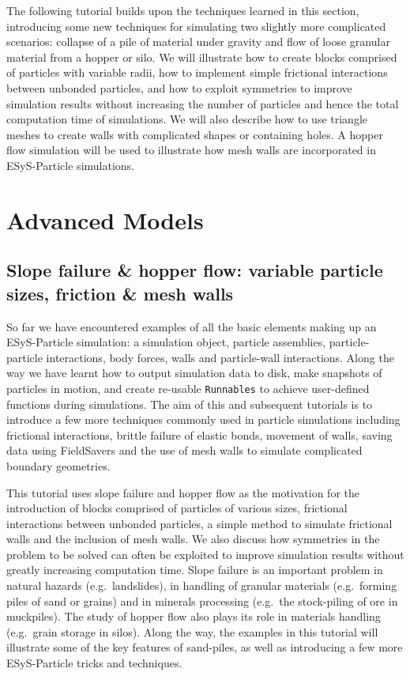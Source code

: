 The following tutorial builds upon the techniques learned in this section, introducing some new techniques for simulating two slightly more complicated scenarios: collapse of a pile of material under gravity and flow of loose granular material from a hopper or silo.  We will illustrate how to create blocks comprised of particles with variable radii, how to implement simple frictional interactions between unbonded particles, and how to exploit symmetries to improve simulation results without increasing the number of particles and hence the total computation time of simulations. We will also describe how to use triangle meshes to create walls with complicated shapes or containing holes. A hopper flow simulation will be used to illustrate how mesh walls are incorporated in ESyS-Particle simulations.

\chapter{Advanced Models}
\section{Slope failure \& hopper flow: variable particle sizes, friction \& mesh walls}

So far we have encountered examples of all the basic elements making up an ESyS-Particle simulation: a simulation object, particle assemblies, particle-particle interactions, body forces, walls and particle-wall interactions. Along the way we have learnt how to output simulation data to disk, make snapshots of particles in motion, and create re-usable \texttt{Runnables} to achieve user-defined functions during simulations. The aim of this and subsequent tutorials is to introduce a few more techniques commonly used in particle simulations including frictional interactions, brittle failure of elastic bonds, movement of walls, saving data using FieldSavers and the use of mesh walls to simulate complicated boundary geometries.

This tutorial uses slope failure and hopper flow as the motivation for the introduction of blocks comprised of particles of various sizes, frictional interactions between unbonded particles, a simple method to simulate frictional walls and the inclusion of mesh walls. We also discuss how symmetries in the problem to be solved can often be exploited to improve simulation results without greatly increasing computation time. Slope failure is an important problem in natural hazards (e.g.\ landslides), in handling of granular materials (e.g.\ forming piles of sand or grains) and in minerals processing (e.g.\ the stock-piling of ore in muckpiles). The study of hopper flow also plays its role in materials handling (e.g.\ grain storage in silos). Along the way, the examples in this tutorial will illustrate some of the key features of sand-piles, as well as introducing a few more ESyS-Particle tricks and techniques.

